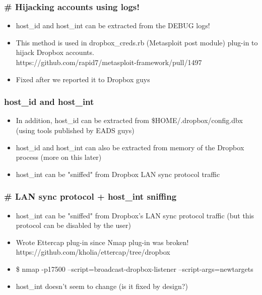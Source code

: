 \documentclass{beamer}
\newcommand\myfont{\fontsize{14}{20}\selectfont}
\begin{document}
\begin{frame}
\frametitle{\# Hijacking accounts using logs!}
\myfont
\begin{itemize}
\itemsep 1em
\item host\_id and host\_int can be extracted from the DEBUG logs!
\item This method is used in dropbox\_creds.rb (Metasploit post module) plug-in
to hijack Dropbox accounts. \\
 \vspace{1em} {\small https://github.com/rapid7/metasploit-framework/pull/1497}
\item Fixed after we reported it to Dropbox guys
\end{itemize}
\end{frame}

\begin{frame}
\frametitle{host\_id and host\_int}
\myfont
\begin{itemize}
\itemsep 1em
\item In addition, host\_id can be extracted from \$HOME/.dropbox/config.dbx (using tools published by EADS guys)
\item host\_id and host\_int can also be extracted from memory of the Dropbox process (more on this later)
\item host\_int can be "sniffed" from Dropbox LAN sync protocol traffic
\end{itemize}
\end{frame}

\begin{frame}
\frametitle{\# LAN sync protocol + host\_int sniffing}
\begin{itemize}
\itemsep 2em
\item host\_int can be "sniffed" from Dropbox's LAN sync protocol traffic (but this protocol can be disabled by the user)
\item Wrote Ettercap plug-in since Nmap plug-in was broken! \\
  \vspace{1em} https://github.com/kholia/ettercap/tree/dropbox
\item \$ nmap -p17500 --script=broadcast-dropbox-listener --script-args=newtargets
\item host\_int doesn't seem to change (is it fixed by design?)
\end{itemize}
\end{frame}
\end{document}
